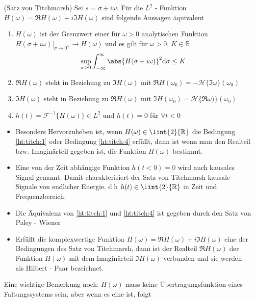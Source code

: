 \begin{satz}\label{ht:titch}(Satz von Titchmarsh) Sei $s = \sigma + i\omega$. Für die $L^2$ - Funktion $H(\omega) = \Re{H(\omega)} + i\Im{H(\omega)}$ sind folgende Aussagen äquivalent
\begin{enumerate}
	\item\label{ht:titch:1} $H(\omega)$ ist der Grenzwert einer für $\omega > 0$ analytischen Funktion $\left. H(\sigma + i\omega)\right|_{\sigma \rightarrow 0^+} \rightarrow H(\omega)$ und es gilt für $\omega> 0$, $K \in \mathbb{R}$ 
	\begin{align}
		\sup_{\sigma > 0}{\int_{-\infty}^{\infty} \abs{H(\sigma + i\omega)}^2 \mathrm{d\sigma}} \leq K	
	\end{align}
	\item\label{ht:titch:2} $\Re{H(\omega)}$ steht in Beziehung zu $\Im{H(\omega)}$ mit
		$\Re{H(\omega_0)} = -\mathscr{H}\{\Im{\omega}\}(\omega_0)$
	\item\label{ht:titch:3} $\Im{H(\omega)}$ steht in Beziehung zu $\Re{H(\omega)}$ mit
		$\Im{H(\omega_0)} = \mathscr{H}\{\Re{\omega)}\}(\omega_0)$ 
	\item\label{ht:titch:4} $h(t) = \mathscr{F}^{-1}\{H(\omega)\} \in L^2$ und $h(t) = 0$ für $\forall t < 0$
\end{enumerate}
\end{satz}
\begin{bem}
\begin{itemize}
\item Besonders Hervorzuheben ist, wenn $H(\omega) \in \lint{2}{\mathbb{R}}$ die Bedingung \ref{ht:titch:1} oder Bedingung \ref{ht:titch:4} erfüllt, dann ist wenn man den Realteil bzw. Imaginärteil gegeben ist, die Funktion $H(\omega)$ bestimmt.
\item Eine von der Zeit abhängige Funktion $h(t < 0) = 0$ wird auch kausales Signal genannt. Damit charakterisiert der Satz von Titchmarsh kausale Signale von endlicher Energie, d.h $h(t) \in \lint{2}{\mathbb{R}}$ in Zeit und Frequenzbereich. 
\item Die Äquivalenz von \ref{ht:titch:1} und \ref{ht:titch:4} ist gegeben durch den Satz von Paley - Wiener \cite{Rubin1991}
\item Erfüllt die komplexwertige Funktion $H(\omega) = \Re{H(\omega)} + i \Im{H(\omega)}$ eine der Bedingungen des Satz von Titchmarsh, dann ist der Realteil $\Re{H(\omega)}$ der Funktion $H(\omega)$ mit dem Imaginärteil $\Im{H(\omega)}$ verbunden und sie werden als Hilbert - Paar bezeichnet.
\end{itemize}
\end{bem}
Eine wichtige Bemerkung noch: $H(\omega)$ muss keine Übertragungsfunktion eines Faltungssystems sein, aber wenn es eine ist, folgt

